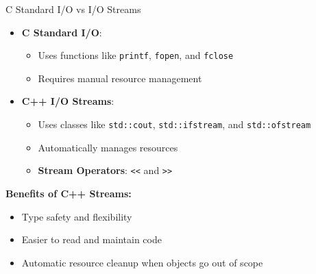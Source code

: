 \begin{frame}[fragile]{ C Standard I/O vs I/O Streams}
    \begin{itemize}
        \item \textbf{C Standard I/O}:
            \begin{itemize}
                \item Uses functions like \texttt{printf}, \texttt{fopen}, and \texttt{fclose}
                \item Requires manual resource management
            \end{itemize}
        \item \textbf{C++ I/O Streams}:
            \begin{itemize}
                \item Uses classes like \texttt{std::cout}, \texttt{std::ifstream}, and \texttt{std::ofstream}
                \item Automatically manages resources
                \item \textbf{Stream Operators}: \texttt{<<} and \texttt{>>}
            \end{itemize}
    \end{itemize}
    \vspace{0.5em}
    \textbf{Benefits of C++ Streams:}
    \begin{itemize}
        \item Type safety and flexibility
        \item Easier to read and maintain code
        \item Automatic resource cleanup when objects go out of scope
    \end{itemize}
\end{frame}

